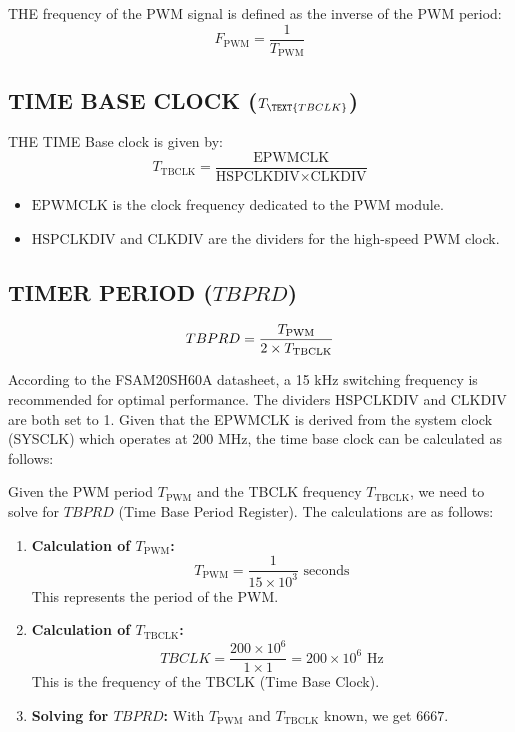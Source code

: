 THE frequency of the PWM signal is defined as the inverse of the PWM period:
\[
	F_{\text{PWM}} = \frac{1}{T_{\text{PWM}}}
\]

\subsection{TIME BASE CLOCK (\( T_{\TEXT{TBCLK}} \))}
THE TIME Base clock is given by:
\[
	T_{\text{TBCLK}} = \frac{\text{EPWMCLK}}{\text{HSPCLKDIV} \times \text{CLKDIV}}
\]
\begin{itemize}
	\item \( \text{EPWMCLK} \) is the clock frequency dedicated to the PWM module.
	\item \( \text{HSPCLKDIV} \) and \( \text{CLKDIV} \) are the dividers for the high-speed PWM clock.
\end{itemize}

\subsection{TIMER PERIOD (\( TBPRD \))}

\[
	TBPRD = {T_{\text{PWM}} \over 2 \times T_{\text{TBCLK}}}
\]

According to the FSAM20SH60A datasheet, a 15 kHz switching frequency is recommended for optimal performance. The dividers \( \text{HSPCLKDIV} \) and \( \text{CLKDIV} \) are both set to 1. Given that the EPWMCLK is derived from the system clock (SYSCLK) which operates at 200 MHz, the time base clock can be calculated as follows:

Given the PWM period \( T_{\text{PWM}} \) and the TBCLK frequency \( T_{\text{TBCLK}} \), we need to solve for \( TBPRD \) (Time Base Period Register). The calculations are as follows:

\begin{enumerate}
	\item \textbf{Calculation of \( T_{\text{PWM}} \):}
	      \[
		      T_{\text{PWM}} = \frac{1}{15 \times 10^3} \text{ seconds}
	      \]
	      This represents the period of the PWM.

	\item \textbf{Calculation of \( T_{\text{TBCLK}} \):}
	      \[
		      TBCLK = \frac{200 \times 10^6}{1 \times 1} = 200 \times 10^6 \text{ Hz}
	      \]
	      This is the frequency of the TBCLK (Time Base Clock).

	\item \textbf{Solving for \( TBPRD \):}
	      With \( T_{\text{PWM}} \) and \( T_{\text{TBCLK}} \) known, we get $6667$.
\end{enumerate}



